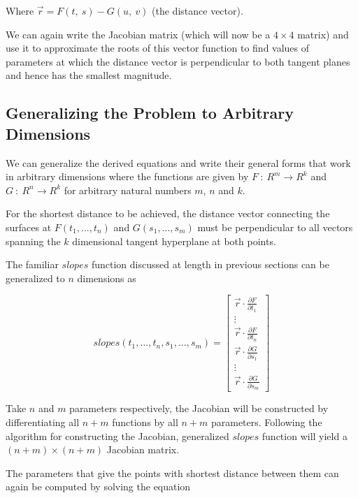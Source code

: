 \documentclass[A4]{article}
\begin{document}
Where $ \vec{r} = F(t, \ s) - G(u, \ v) $ (the distance vector).

We can again write the Jacobian matrix (which will now be a $4 \times 4$ matrix) and use it to approximate the roots of this vector function to find values of parameters at which the distance vector is perpendicular to both tangent planes and hence has the smallest magnitude.

\subsection{Generalizing the Problem to Arbitrary Dimensions}

We can generalize the derived equations and write their general forms that work in arbitrary dimensions where the functions are given by $F \ : \ R^m \rightarrow R^k$ and $G \ : \ R^n \rightarrow R^k$ for arbitrary natural numbers $m$, $n$ and $k$. 

For the shortest distance to be achieved, the distance vector connecting the surfaces at $ F(t_{1},...,t_{n}) $ and $G(s_{1},...,s_{m})$ must be perpendicular to all vectors spanning the $k$ dimensional tangent hyperplane at both points.

The familiar $slopes$ function discussed at length in previous sections can be generalized to $n$ dimensions as

\begin{equation}
slopes(t_{1},...,t_{n},s_{1},...,s_{m}) = \begin{bmatrix} \vec{r} \cdot \frac{\partial F}{\partial t_{1}} \\ \vdots
\\ \vec{r} \cdot \frac{\partial F}{\partial t_{n}}  \\
\vec{r} \cdot \frac{\partial G}{\partial s_{1}} \\ \vdots \\
\vec{r} \cdot \frac{\partial G}{\partial s_{m}} \end{bmatrix}
\end{equation}

Take $n$ and $m$ parameters respectively, the Jacobian will be constructed by differentiating all $n+m$ functions by all $n+m$ parameters. Following the algorithm for constructing the Jacobian, generalized $slopes$ function will yield a $(n+m) \times (n+m)$ Jacobian matrix.

The parameters that give the points with shortest distance between them can again be computed by solving the equation
\end{document}
